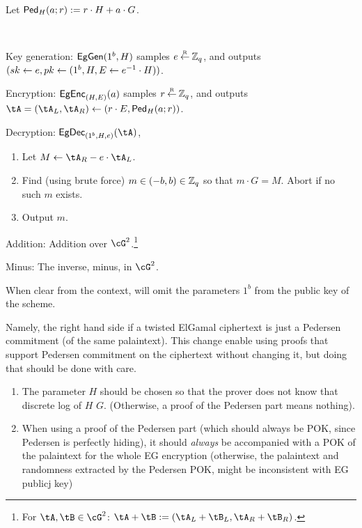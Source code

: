 \begin{notation}
Let $\mathsf{Ped}_H(a;r) := r\cdot H + a \cdot G$.
\end{notation}

\begin{algorithm}\label{alg:tEGinExp}~
	
	
	\item[Key generation:] $\mathsf{EgGen}(1^b,H)$ samples $e\mathbin{\stackrel{\mbox{\tiny R}}{\leftarrow}} {\mathbb Z}_q$, and outputs $({sk} 
	\leftarrow e,{pk} \leftarrow (1^b,H,E\leftarrow  e^{-1}\cdot H))$.
	
	\item[Encryption:] $\mathsf{EgEnc}_{(H,E)}(a)$  samples $r\mathbin{\stackrel{\mbox{\tiny R}}{\leftarrow}} {\mathbb Z}_q$, and outputs  $\tA  = (\tA _L,\tA _R)\asn (r\cdot E, \Ped_H(a;r))$. 
	\item[Decryption:] $\EgDec_{(1^b,H,e)}(\tA)$,   
	\begin{enumerate}
		\item 	Let $M \asn \tA_R - e\cdot \tA_L$.
		
		\item Find (using brute force) $m\in (-b, b) \in {\mathbb Z}_q$ so that $m\cdot G = M$. Abort if no such $m$ exists. 
		
		\item Output $m$.
	\end{enumerate}
	
	\item[Addition:] Addition over  $\cG^2$.\footnote{For $\tA,\tB \in \cG^2$: $\tA +\tB \eqdef (\tA_L+\tB_L,\tA_R+\tB_R)$.}
	
	\item[Minus:]  The inverse, \ie minus, in $\cG^2$.
	
\end{algorithm}	
When clear from the context,  will omit the parameters $1^b$ from the public key of the scheme.

Namely, the right hand side if a twisted ElGamal ciphertext is just a  Pedersen  commitment \cite{Pedersen91} (of the same palaintext). This change enable  using proofs that  support  Pedersen commitment on the ciphertext without changing it, but doing that  should be done with care.
\begin{enumerate}
	\item The parameter $H$ should be chosen so that the prover does not know that discrete log of $H$ \wrt $G$. (Otherwise, a proof of the Pedersen part means nothing).
	
	\item When using a proof of  the Pedersen part (which should always be POK, since Pedersen is perfectly hiding), it should \emph{always} be accompanied with a POK of the palaintext for the whole EG encryption (otherwise, the palaintext and randomness  extracted by the  Pedersen POK, might be  inconsistent with  EG publicj key)  
\end{enumerate}

